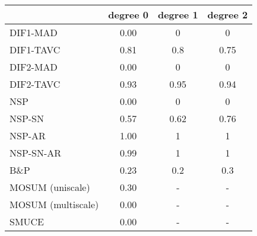 \begin{tabular}{|l|c|c|c|}
  \hline
 & degree 0 & degree 1 & degree 2 \\ 
  \hline
DIF1-MAD & 0.00 & 0 & 0 \\ 
  DIF1-TAVC & 0.81 & 0.8 & 0.75 \\ 
  DIF2-MAD & 0.00 & 0 & 0 \\ 
  DIF2-TAVC & 0.93 & 0.95 & 0.94 \\ 
  NSP & 0.00 & 0 & 0 \\ 
  NSP-SN & 0.57 & 0.62 & 0.76 \\ 
  NSP-AR & 1.00 & 1 & 1 \\ 
  NSP-SN-AR & 0.99 & 1 & 1 \\ 
  B\&P & 0.23 & 0.2 & 0.3 \\ 
  MOSUM (uniscale) & 0.30 & - & - \\ 
  MOSUM (multiscale) & 0.00 & - & - \\ 
  SMUCE & 0.00 & - & - \\ 
   \hline
\end{tabular}
